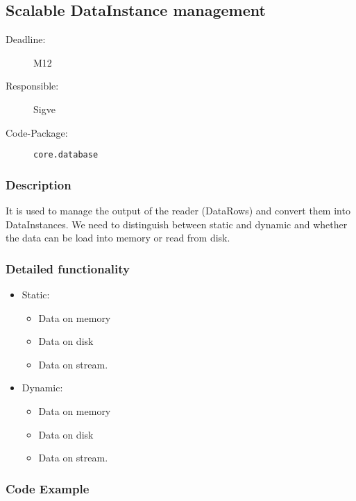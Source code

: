\newpage
\subsection{Scalable DataInstance management}
\label{Functionality:ID}

\begin{description}
\item[Deadline:] M12
\item[Responsible:] Sigve
\item[Code-Package:] \texttt{core.database}
\end{description}

\subsubsection*{Description}

It is used to manage the output of the reader (DataRows) and convert them into DataInstances. We need to distinguish between static and dynamic and whether the data can be load into memory or read from disk.



\subsubsection*{Detailed functionality}

\begin{itemize}
\item Static:

\begin{itemize}
\item Data on memory
\item Data on disk
\item Data on stream.
\end{itemize}
\item Dynamic:
\begin{itemize}
\item Data on memory
\item Data on disk
\item Data on stream.
\end{itemize}
\end{itemize}

\subsubsection*{Code Example}


